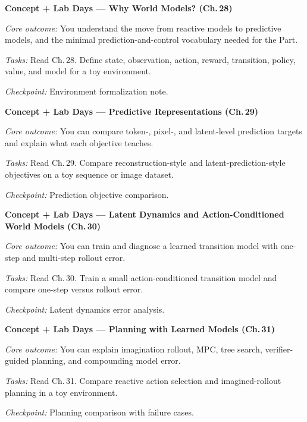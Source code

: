 \begin{description}[style=nextline, leftmargin=1.8cm, labelwidth=1.5cm]

\item[Day 73] \textbf{Concept + Lab Days --- Why World Models? (Ch.\,28)}

\textit{Core outcome:} You understand the move from reactive models to predictive models, and the minimal prediction-and-control vocabulary needed for the Part.

\textit{Tasks:} Read Ch.\,28. Define state, observation, action, reward, transition, policy, value, and model for a toy environment.

\textit{Checkpoint:} Environment formalization note.

\item[Day 74--75] \textbf{Concept + Lab Days --- Predictive Representations (Ch.\,29)}

\textit{Core outcome:} You can compare token-, pixel-, and latent-level prediction targets and explain what each objective teaches.

\textit{Tasks:} Read Ch.\,29. Compare reconstruction-style and latent-prediction-style objectives on a toy sequence or image dataset.

\textit{Checkpoint:} Prediction objective comparison.

\item[Day 76--77] \textbf{Concept + Lab Days --- Latent Dynamics and Action-Conditioned World Models (Ch.\,30)}

\textit{Core outcome:} You can train and diagnose a learned transition model with one-step and multi-step rollout error.

\textit{Tasks:} Read Ch.\,30. Train a small action-conditioned transition model and compare one-step versus rollout error.

\textit{Checkpoint:} Latent dynamics error analysis.

\item[Day 78--79] \textbf{Concept + Lab Days --- Planning with Learned Models (Ch.\,31)}

\textit{Core outcome:} You can explain imagination rollout, MPC, tree search, verifier-guided planning, and compounding model error.

\textit{Tasks:} Read Ch.\,31. Compare reactive action selection and imagined-rollout planning in a toy environment.

\textit{Checkpoint:} Planning comparison with failure cases.


\end{description}
